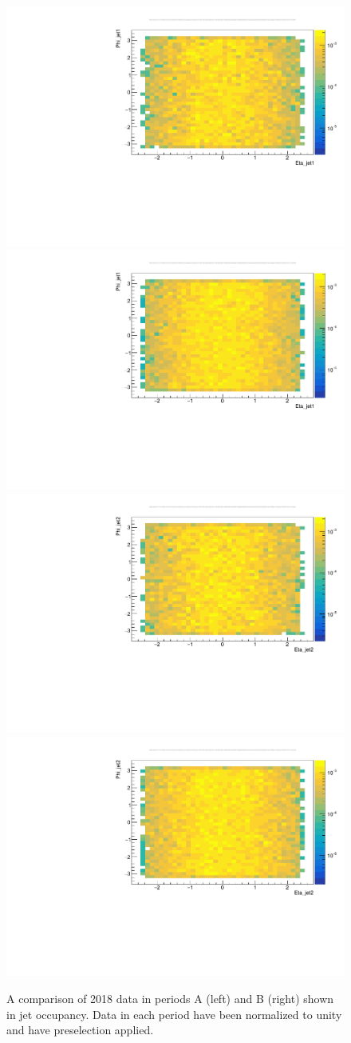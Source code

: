\begin{figure}[H]
    \centering
    {\includegraphics[width=.49\textwidth]{Images/Analysis/Results_HEMFailureStudyPlots_Data_BeforeAfterRun319077_JetOccupancy/Jet1_Phi_vs_Eta_BeforeRun319077.pdf}}
    {\includegraphics[width=.49\textwidth]{Images/Analysis/Results_HEMFailureStudyPlots_Data_BeforeAfterRun319077_JetOccupancy/Jet1_Phi_vs_Eta_AfterRun319077.pdf}}
    {\includegraphics[width=.49\textwidth]{Images/Analysis/Results_HEMFailureStudyPlots_Data_BeforeAfterRun319077_JetOccupancy/Jet2_Phi_vs_Eta_BeforeRun319077.pdf}}
    {\includegraphics[width=.49\textwidth]{Images/Analysis/Results_HEMFailureStudyPlots_Data_BeforeAfterRun319077_JetOccupancy/Jet2_Phi_vs_Eta_AfterRun319077.pdf}}
    \caption{A comparison of 2018 data in periods A (left) and B (right) shown in jet occupancy. Data in each period have been normalized to unity and have preselection applied.}
    \label{figapp:hemjetoccupancy}
\end{figure}